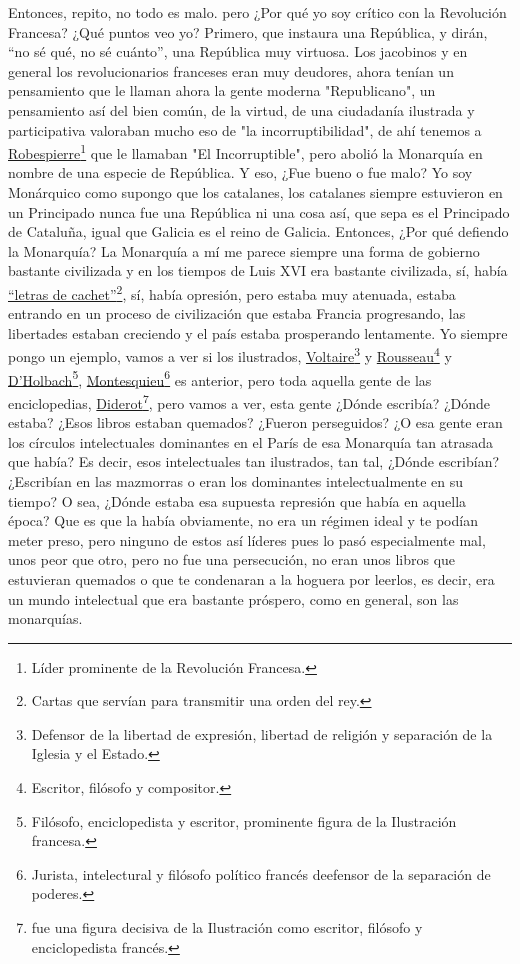 Entonces, repito, no todo es malo. pero ¿Por qué yo soy crítico con la Revolución Francesa? ¿Qué puntos veo yo? Primero, que instaura una República, y dirán, \enquote{no sé qué, no sé cuánto}, una República muy virtuosa. Los jacobinos y en general los revolucionarios franceses eran muy deudores, ahora tenían un pensamiento que le llaman ahora la gente moderna "Republicano", un pensamiento así del bien común, de la virtud, de una ciudadanía ilustrada y participativa valoraban mucho eso de "la incorruptibilidad", de ahí tenemos a \href{https://en.wikipedia.org/wiki/Maximilien_Robespierre}{Robespierre}\footnote{Líder prominente de la Revolución Francesa.} que le llamaban "El Incorruptible", pero abolió la Monarquía en nombre de una especie de República. Y eso, ¿Fue bueno o fue malo? Yo soy Monárquico como supongo que los catalanes, los catalanes siempre estuvieron en un Principado nunca fue una República ni una cosa así, que sepa es el Principado de Cataluña, igual que Galicia es el reino de Galicia. Entonces, ¿Por qué defiendo la Monarquía? La Monarquía a mí me parece siempre una forma de gobierno bastante civilizada y en los tiempos de Luis XVI era bastante civilizada,  sí, había \href{https://en.wikipedia.org/wiki/Lettres_de_cachet}{\enquote{letras de cachet}}\footnote{Cartas que servían para transmitir una orden del rey.}, sí, había opresión, pero estaba muy atenuada, estaba entrando en un proceso de civilización que estaba Francia progresando, las libertades estaban creciendo y el país estaba prosperando lentamente. Yo siempre pongo un ejemplo, vamos a ver si los ilustrados, \href{https://en.wikipedia.org/wiki/Voltaire}{Voltaire}\footnote{Defensor de la libertad de expresión, libertad de religión y separación de la Iglesia y el Estado.} y \href{https://en.wikipedia.org/wiki/Jean-Jacques_Rousseau}{Rousseau}\footnote{Escritor, filósofo y compositor.} y \href{https://en.wikipedia.org/wiki/Baron_d%27Holbach}{D'Holbach}\footnote{Filósofo, enciclopedista y escritor, prominente figura de la Ilustración francesa.}, \href{https://en.wikipedia.org/wiki/Montesquieu}{Montesquieu}\footnote{Jurista, intelectural y filósofo político francés deefensor de la separación de poderes.} es anterior, pero toda aquella gente de las enciclopedias, \href{https://en.wikipedia.org/wiki/Denis_Diderot}{Diderot}\footnote{fue una figura decisiva de la Ilustración como escritor, filósofo y enciclopedista francés.}, pero vamos a ver, esta gente ¿Dónde escribía? ¿Dónde estaba? ¿Esos libros estaban quemados? ¿Fueron perseguidos? ¿O esa gente eran los círculos intelectuales dominantes en el París de esa Monarquía tan atrasada que había? Es decir, esos intelectuales tan ilustrados, tan tal, ¿Dónde escribían? ¿Escribían en las mazmorras o eran los dominantes intelectualmente en su tiempo? O sea, ¿Dónde estaba esa supuesta represión que había en aquella época? Que es que la había obviamente, no era un régimen ideal y te podían meter preso, pero ninguno de estos así líderes pues lo pasó especialmente mal, unos peor que otro, pero no fue una persecución, no eran unos libros que estuvieran quemados o que te condenaran a la hoguera por leerlos, es decir, era un mundo intelectual que era bastante próspero, como en general, son las monarquías.

